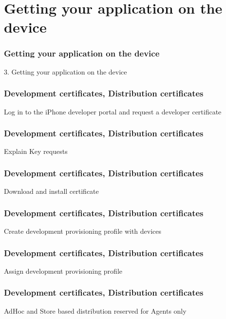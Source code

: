\documentclass[10pt]{beamer}
\begin{document}
    

   
  

  
    
\section{Getting your application on the device}
\begin{frame}[fragile]
  \frametitle{Getting your application on the device}
  3. Getting your application on the device
\end{frame}


    
\begin{frame}[fragile]
  \frametitle{Development certificates, Distribution certificates}
  Log in to the iPhone developer portal and request a developer certificate

\end{frame}

\begin{frame}[fragile]
  \frametitle{Development certificates, Distribution certificates}
  Explain Key requests

\end{frame}

\begin{frame}[fragile]
  \frametitle{Development certificates, Distribution certificates}
  Download and install certificate

\end{frame}

\begin{frame}[fragile]
  \frametitle{Development certificates, Distribution certificates}
  Create development provisioning profile with devices

\end{frame}

\begin{frame}[fragile]
  \frametitle{Development certificates, Distribution certificates}
  Assign development provisioning profile

\end{frame}

\begin{frame}[fragile]
  \frametitle{Development certificates, Distribution certificates}
  AdHoc and Store based distribution reserved for Agents only

\end{frame}
\end{document}
